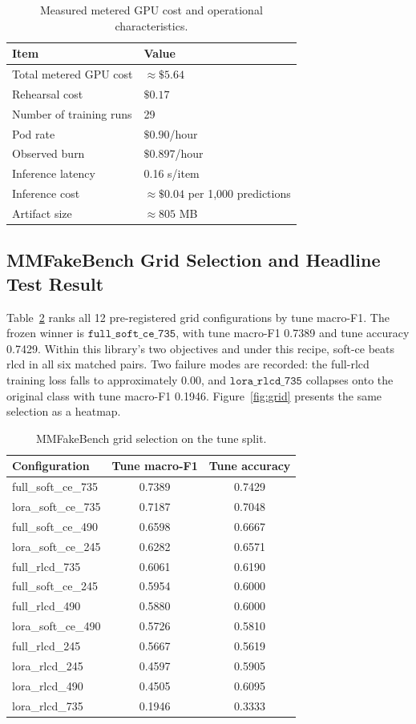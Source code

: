 \documentclass{article} %
\begin{document}
\begin{table}[t]
\centering
\small
\caption{Measured metered GPU cost and operational characteristics.}
\label{tab:cost}
\begin{tabular}{ll}
\toprule
Item & Value \\
\midrule
Total metered GPU cost & \(\approx \$5.64\) \\
Rehearsal cost & \(\$0.17\) \\
Number of training runs & 29 \\
Pod rate & \(\$0.90\)/hour \\
Observed burn & \(\$0.897\)/hour \\
Inference latency & 0.16 s/item \\
Inference cost & \(\approx \$0.04\) per 1,000 predictions \\
Artifact size & \(\approx 805\) MB \\
\bottomrule
\end{tabular}
\end{table}

\subsection{MMFakeBench Grid Selection and Headline Test Result}
Table~\ref{tab:grid} ranks all 12 pre-registered grid configurations by tune macro-F1. The frozen winner is \( \texttt{full\_soft\_ce\_735} \), with tune macro-F1 0.7389 and tune accuracy 0.7429. Within this library's two objectives and under this recipe, soft-ce beats rlcd in all six matched pairs. Two failure modes are recorded: the full-rlcd training loss falls to approximately 0.00, and \( \texttt{lora\_rlcd\_735} \) collapses onto the original class with tune macro-F1 0.1946. Figure~\ref{fig:grid} presents the same selection as a heatmap.

\begin{table}[t]
\centering
\small
\caption{MMFakeBench grid selection on the tune split.}
\label{tab:grid}
\begin{tabular}{lcc}
\toprule
Configuration & Tune macro-F1 & Tune accuracy \\
\midrule
full\_soft\_ce\_735 & 0.7389 & 0.7429 \\
lora\_soft\_ce\_735 & 0.7187 & 0.7048 \\
full\_soft\_ce\_490 & 0.6598 & 0.6667 \\
lora\_soft\_ce\_245 & 0.6282 & 0.6571 \\
full\_rlcd\_735 & 0.6061 & 0.6190 \\
full\_soft\_ce\_245 & 0.5954 & 0.6000 \\
full\_rlcd\_490 & 0.5880 & 0.6000 \\
lora\_soft\_ce\_490 & 0.5726 & 0.5810 \\
full\_rlcd\_245 & 0.5667 & 0.5619 \\
lora\_rlcd\_245 & 0.4597 & 0.5905 \\
lora\_rlcd\_490 & 0.4505 & 0.6095 \\
lora\_rlcd\_735 & 0.1946 & 0.3333 \\
\bottomrule
\end{tabular}
\end{table}
\end{document}
